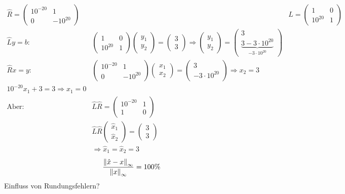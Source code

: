 \begin{align*}
  \hat{R} = \begin{pmatrix}
    10^{-20} & 1 \\
    0 & -10^{20}
  \end{pmatrix} && \hat{L} = \begin{pmatrix}
    1 & 0 \\
    10^{20} & 1
  \end{pmatrix}\\
  \hat{L} y = b: & \begin{pmatrix} 1 & 0 \\ 10^{20} & 1 \end{pmatrix} \begin{pmatrix} y_1 \\ y_2 \end{pmatrix} =
  \begin{pmatrix} 3 \\ 3 \end{pmatrix} \Rightarrow \begin{pmatrix} y_1 \\ y_2 \end{pmatrix} = \begin{pmatrix}
    3 \\ \underbrace{3 - 3\cdot 10^{20}}_{-3 \cdot 10^{20}}
  \end{pmatrix}\\
  \hat{R} x = y: & \begin{pmatrix} 10^{-20} & 1 \\ 0 & -10^{20} \end{pmatrix} \begin{pmatrix} x_1 \\ x_2 \end{pmatrix} =
  \begin{pmatrix} 3 \\ -3 \cdot 10^{20} \end{pmatrix} \Rightarrow x_2 = 3\\
  10^{-20}x_1 + 3 = 3 \Rightarrow x_1 = 0\\
  \text{Aber: } & \hat{L}\hat{R} = \begin{pmatrix} 10^{-20} & 1 \\ 1 & 0 \end{pmatrix} \\
  & \hat{L}\hat{R} \begin{pmatrix} \hat{x}_1 \\ \hat{x}_2 \end{pmatrix} = \begin{pmatrix} 3 \\ 3 \end{pmatrix} \\
  & \Rightarrow \hat{x}_1 = \hat{x}_2 = 3
\end{align*}
\begin{align*}
  \frac{\left\lVert \hat{x}-x \right\rVert_{\infty}}{\left\lVert x \right\rVert_\infty} = 100\%
\end{align*}
Einfluss von Rundungsfehlern?\\

